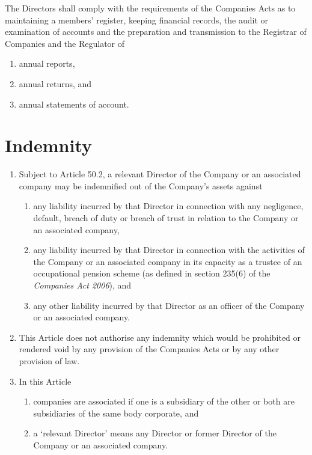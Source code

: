 \documentclass[a4paper,12pt]{article}
\renewcommand{\labelenumii}{(\alph{enumii})}
\begin{document}
The Directors shall comply with the requirements of the Companies Acts as to maintaining a members’ register, keeping financial records, the audit or examination of accounts and the preparation and transmission to the Registrar of Companies and the Regulator of

\begin{enumerate}
  \item annual reports,
  \item annual returns, and
  \item annual statements of account.
\end{enumerate}

\section{Indemnity}

\begin{enumerate}
  \item Subject to Article 50.2, a relevant Director of the Company or an associated company may be indemnified out of the Company’s assets against
  \begin{enumerate}
    \renewcommand{\labelenumii}{(\alph{enumii})}
    \item any liability incurred by that Director in connection with any negligence, default, breach of duty or breach of trust in relation to the Company or an associated company,
    \item any liability incurred by that Director in connection with the activities of the Company or an associated company in its capacity as a trustee of an occupational pension scheme (as defined in section 235(6) of the \textit{Companies Act 2006}), and
    \item any other liability incurred by that Director as an officer of the Company or an associated company.
  \end{enumerate}
  \item This Article does not authorise any indemnity which would be prohibited or rendered void by any provision of the Companies Acts or by any other provision of law.
  \item In this Article
  \begin{enumerate}
    \item companies are associated if one is a subsidiary of the other or both are subsidiaries of the same body corporate, and
    \item a `relevant Director' means any Director or former Director of the Company or an associated company.
  \end{enumerate}
\end{enumerate}
\end{document}
